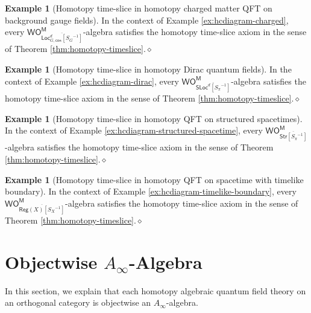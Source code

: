 \documentclass[11pt]{amsbook}
\numberwithin{section}{chapter}
\numberwithin{subsection}{section}
\numberwithin{equation}{section}
\theoremstyle{plain}
\theoremstyle{definition}
\newtheorem{example}[equation]{Example}
\newcommand{\M}{\mathsf{M}}
\renewcommand{\O}{\mathsf{O}}
\newcommand{\Otom}{\O^{\M}}
\newcommand{\W}{\mathsf{W}}
\newcommand{\dqed}{\hfill$\diamond$}
\newcommand{\inv}[1]{{#1}^{-1}}
\newcommand{\Bgconloc}{\Locd_{G,\mathsf{con}}}
\newcommand{\Bgconlocsginv}{\Bgconloc[\inv{S_G}]}
\newcommand{\Bgconlocsginvbar}{\overline{\Bgconlocsginv}}
\newcommand{\Loc}{\mathsf{Loc}}
\newcommand{\Locd}{\Loc^d}
\newcommand{\Reg}{\mathsf{Reg}}
\newcommand{\Regx}{\Reg(X)}
\newcommand{\Regxsinv}{\Regx[\inv{S_X}]}
\newcommand{\Regxsinvbar}{\overline{\Regxsinv}}
\newcommand{\Sloc}{\mathsf{SLoc}}
\newcommand{\Slocd}{\Sloc^d}
\newcommand{\Slocdsinv}{\Slocd[\inv{S_{\pi}}]}
\newcommand{\Slocdsinvbar}{\overline{\Slocdsinv}}
\newcommand{\Str}{\mathsf{Str}}
\newcommand{\Strsinv}{\Str[\inv{S_{\pi}}]}
\newcommand{\Strsinvbar}{\overline{\Strsinv}}
\newcommand{\wom}{\W\Otom}
\begin{document}
\begin{example}[Homotopy time-slice in homotopy charged matter QFT on background gauge fields]\label{ex:hts-charged}
In the context of Example \ref{ex:hcdiagram-charged}, every  $\wom_{\Bgconlocsginvbar}$-algebra satisfies the homotopy time-slice axiom in the sense of Theorem \ref{thm:homotopy-timeslice}.\dqed
\end{example}

\begin{example}[Homotopy time-slice in homotopy Dirac quantum fields]\label{ex:hts-dirac}
In the context of Example \ref{ex:hcdiagram-dirac}, every  $\wom_{\Slocdsinvbar}$-algebra satisfies the homotopy time-slice axiom in the sense of Theorem \ref{thm:homotopy-timeslice}.\dqed
\end{example}

\begin{example}[Homotopy time-slice in homotopy QFT on structured spacetimes]\label{ex:hts-structured-spacetime}
In the context of Example \ref{ex:hcdiagram-structured-spacetime}, every  $\wom_{\Strsinvbar}$-algebra satisfies the homotopy time-slice axiom in the sense of Theorem \ref{thm:homotopy-timeslice}.\dqed
\end{example}

\begin{example}[Homotopy time-slice in homotopy QFT on spacetime with timelike boundary]\label{ex:hts-boundary}
In the context of Example \ref{ex:hcdiagram-timelike-boundary}, every  $\wom_{\Regxsinvbar}$-algebra satisfies the homotopy time-slice axiom in the sense of Theorem \ref{thm:homotopy-timeslice}.\dqed
\end{example}


\section{Objectwise $A_\infty$-Algebra}\label{sec:objective-ainfinity}

In this section, we explain that each homotopy algebraic quantum field theory on an orthogonal category is objectwise an $A_\infty$-algebra.
\end{document}
